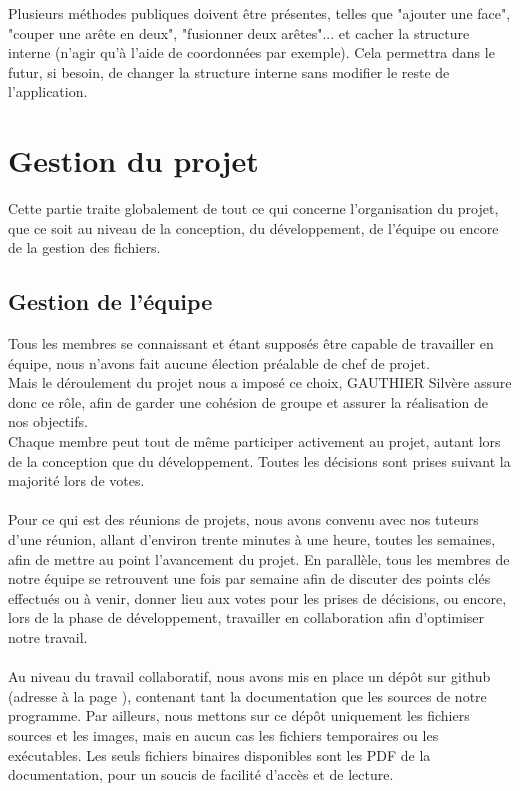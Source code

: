 \documentclass[a4paper]{memoir}
\begin{document}
				Plusieurs méthodes publiques doivent être présentes, telles que "ajouter une face", "couper une arête en deux", "fusionner deux arêtes"... 
				et cacher la structure interne (n'agir qu'à l'aide de coordonnées par exemple). Cela permettra dans le futur, si besoin, de changer la 
				structure interne sans modifier le reste de l'application.
		
	\chapter{Gestion du projet}
		Cette partie traite globalement de tout ce qui concerne l'organisation du projet, que ce soit au niveau de la conception, du développement, de 
		l'équipe ou encore de la gestion des fichiers.
		
		\section{Gestion de l'équipe}
			Tous les membres se connaissant et étant supposés être capable de travailler en équipe, nous n'avons fait aucune élection préalable de chef de 
			projet.\\ Mais le déroulement du projet nous a imposé ce choix, GAUTHIER Silvère assure donc ce rôle, afin de garder une cohésion de groupe 
			et assurer la réalisation de nos objectifs.\\ Chaque membre peut tout de même participer activement au projet, autant lors de la conception que 
			du développement. Toutes les décisions sont prises suivant la majorité lors de votes.\\\\
			Pour ce qui est des réunions de projets, nous avons convenu avec nos tuteurs d'une réunion, allant d'environ trente minutes à une heure, toutes 
			les semaines, afin de mettre au point l'avancement du projet. En parallèle, tous les membres de notre équipe se retrouvent une fois par semaine 
			afin de discuter des points clés effectués ou à venir, donner lieu aux votes pour les prises de décisions, ou encore, lors de la phase de 
			développement, travailler en collaboration afin d'optimiser notre travail.\\\\
			Au niveau du travail collaboratif, nous avons mis en place un dépôt sur github (adresse à la page \pageref{url:github}), contenant tant la 
			documentation que les sources de notre programme. Par ailleurs, nous mettons sur ce dépôt uniquement les fichiers sources et les images, mais 
			en aucun cas les fichiers temporaires ou les exécutables. Les seuls fichiers binaires disponibles sont les PDF de la documentation, pour un 
			soucis de facilité d'accès et de lecture.
\end{document}
